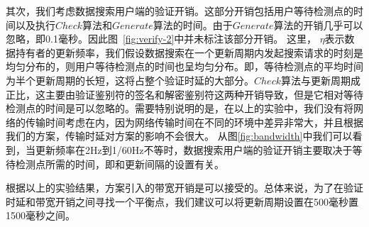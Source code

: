 其次，我们考虑数据搜索用户端的验证开销。这部分开销包括用户等待检测点的时间以及执行$Check$算法和$Generate$算法的时间。由于$Generate$算法的开销几乎可以忽略，即0.1毫秒。因此图~\ref{fig:verify-2}中并未标注该部分开销。
这里， $\eta$表示数据持有者的更新频率，我们假设数据搜索在一个更新周期内发起搜索请求的时刻是均匀分布的，则用户等待检测点的时间也呈均匀分布。即，等待检测点的平均时间为半个更新周期的长短，这将占整个验证时延的大部分。$Check$算法与更新周期成正比，这主要由验证鉴别符的签名和解密鉴别符这两种开销导致，但是它相对等待检测点的时间是可以忽略的。需要特别说明的是，在以上的实验中，我们没有将网络的传输时间考虑在内，因为网络传输时间在不同的环境中差异非常大，并且根据我们的方案，传输时延对方案的影响不会很大。
从图\ref{fig:bandwidth}中我们可以看到，当更新频率在2Hz到1/60Hz不等时，数据搜索用户端的验证开销主要取决于等待检测点所需的时间，即和更新间隔的设置有关。

根据以上的实验结果，\multi 方案引入的带宽开销是可以接受的。总体来说，为了在验证时延和带宽开销之间寻找一个平衡点，我们建议可以将更新周期设置在500毫秒置1500毫秒之间。
